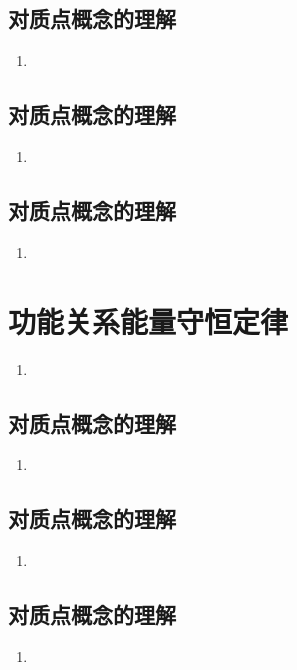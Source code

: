 \documentclass[cn,11pt]{elegantbook}
\begin{document}
\section{对质点概念的理解}
\begin{enumerate}
   \item 
\end{enumerate}

\section{对质点概念的理解}
\begin{enumerate}
   \item 
\end{enumerate}

\section{对质点概念的理解}
\begin{enumerate}
   \item 
\end{enumerate}


\chapter{功能关系能量守恒定律}
\begin{enumerate}
   \item 
\end{enumerate}

\section{对质点概念的理解}
\begin{enumerate}
   \item 
\end{enumerate}

\section{对质点概念的理解}
\begin{enumerate}
   \item 
\end{enumerate}

\section{对质点概念的理解}
\begin{enumerate}
   \item 
\end{enumerate}
\end{document}
